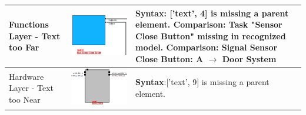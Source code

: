 \begin{longtable}{p{} >{\raggedright\arraybackslash}m{} >{\raggedright\arraybackslash}m{}}
    \midrule
    Functions Layer - Text too Far & \includegraphics[width=\linewidth]{pictures/60_text_too_far_output_clip.png} & \textbf{Syntax}: ['text', 4] is missing a parent element. \newline
        \textbf{Comparison}: Task "Sensor Close Button" missing in recognized model. \newline
        \textbf{Comparison}: Signal Sensor Close Button: A $\rightarrow$ Door System \\
    \midrule
    Hardware Layer - Text too Near & \includegraphics[width=1\linewidth]{pictures/61_text_too_far_output_clip.png} & \textbf{Syntax}:['text', 9] is missing a parent element. \\
\end{longtable}


